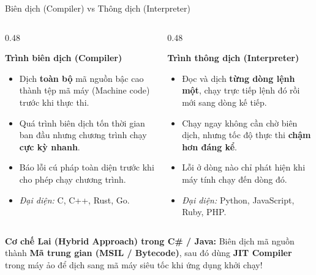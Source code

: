 \documentclass[aspectratio=169, 10pt]{beamer}
\begin{document}
\begin{frame}{Biên dịch (Compiler) vs Thông dịch (Interpreter)}
  \begin{columns}[T]
    \begin{column}{0.48\textwidth}
      \begin{block}{\textbf{Trình biên dịch (Compiler)}}
        \begin{itemize}
          \item Dịch \textbf{toàn bộ} mã nguồn bậc cao thành tệp mã máy (Machine code) trước khi thực thi.
          \item Quá trình biên dịch tốn thời gian ban đầu nhưng chương trình chạy \textbf{cực kỳ nhanh}.
          \item Báo lỗi cú pháp toàn diện trước khi cho phép chạy chương trình.
          \item \textit{Đại diện:} C, C++, Rust, Go.
        \end{itemize}
      \end{block}
    \end{column}
    \begin{column}{0.48\textwidth}
      \begin{block}{\textbf{Trình thông dịch (Interpreter)}}
        \begin{itemize}
          \item Đọc và dịch \textbf{từng dòng lệnh một}, chạy trực tiếp lệnh đó rồi mới sang dòng kế tiếp.
          \item Chạy ngay không cần chờ biên dịch, nhưng tốc độ thực thi \textbf{chậm hơn đáng kể}.
          \item Lỗi ở dòng nào chỉ phát hiện khi máy tính chạy đến dòng đó.
          \item \textit{Đại diện:} Python, JavaScript, Ruby, PHP.
        \end{itemize}
      \end{block}
    \end{column}
  \end{columns}
  \vskip 2mm
  \begin{alertblock}{\textbf{Cơ chế Lai (Hybrid Approach) trong C\# / Java:}}
    Biên dịch mã nguồn thành \textbf{Mã trung gian (MSIL / Bytecode)}, sau đó dùng \textbf{JIT Compiler} trong máy ảo để dịch sang mã máy siêu tốc khi ứng dụng khởi chạy!
  \end{alertblock}
\end{frame}
\end{document}

